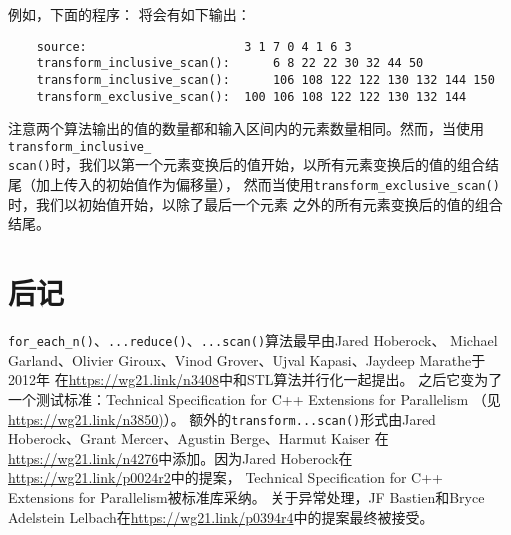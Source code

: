 例如，下面的程序：
将会有如下输出：
\begin{lstlisting}
    source:                      3 1 7 0 4 1 6 3
    transform_inclusive_scan():      6 8 22 22 30 32 44 50
    transform_inclusive_scan():      106 108 122 122 130 132 144 150
    transform_exclusive_scan():  100 106 108 122 122 130 132 144
\end{lstlisting}
注意两个算法输出的值的数量都和输入区间内的元素数量相同。然而，当使用\texttt{transform\_inclusive\_\\
scan()}时，我们以第一个元素变换后的值开始，以所有元素变换后的值的组合结尾（加上传入的初始值作为偏移量），
然而当使用\texttt{transform\_exclusive\_scan()}时，我们以初始值开始，以除了最后一个元素
之外的所有元素变换后的值的组合结尾。

\section{后记}
\texttt{for\_each\_n()}、\texttt{...reduce()}、\texttt{...scan()}算法最早由Jared Hoberock、
Michael Garland、Olivier Giroux、Vinod Grover、Ujval Kapasi、Jaydeep Marathe于2012年
在\url{https://wg21.link/n3408}中和STL算法并行化一起提出。
之后它变为了一个测试标准：Technical Specification for C++ Extensions for Parallelism
（见\url{https://wg21.link/n3850)}）。
额外的\texttt{transform...scan()}形式由Jared Hoberock、Grant Mercer、Agustin Berge、Harmut Kaiser
在\url{https://wg21.link/n4276}中添加。因为Jared Hoberock在\url{https://wg21.link/p0024r2}中的提案，
Technical Specification for C++ Extensions for Parallelism被标准库采纳。
关于异常处理，JF Bastien和Bryce Adelstein Lelbach在\url{https://wg21.link/p0394r4}中的提案最终被接受。